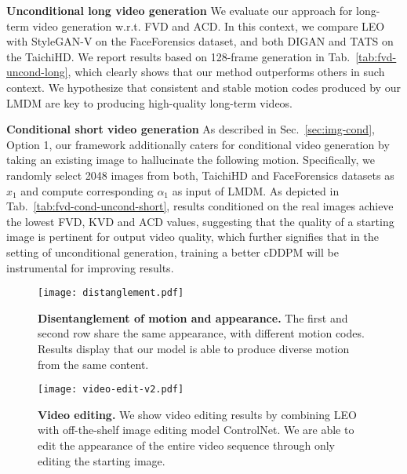 \textbf{Unconditional long video generation} 
We evaluate our approach for long-term video generation w.r.t. FVD and ACD. In this context, we compare LEO with StyleGAN-V on the FaceForensics dataset, and both DIGAN and TATS on the TaichiHD. We report results based on 128-frame generation in Tab.~\ref{tab:fvd-uncond-long}, which clearly shows that our method outperforms others in such context. We hypothesize that consistent and stable motion codes produced by our LMDM are key to producing high-quality long-term videos.

\textbf{Conditional short video generation}
As described in Sec.~\ref{sec:img-cond}, Option 1, our framework additionally caters for conditional video generation by taking an existing image to hallucinate the following motion. Specifically, we randomly select 2048 images from both, TaichiHD and FaceForensics datasets as $x_1$ and compute corresponding $\alpha_1$ as input of LMDM. As depicted in Tab.~\ref{tab:fvd-cond-uncond-short}, results conditioned on the real images achieve the lowest FVD, KVD and ACD values, suggesting that the quality of a starting image is pertinent for output video quality, which further signifies that in the setting of unconditional generation, training a better cDDPM will be instrumental for improving results.

\begin{figure*}[t!]
\centering
\texttt{[image: distanglement.pdf]}  
\caption{\textbf{Disentanglement of motion and appearance.} The first and second row share the same appearance, with different motion codes. Results display that our model is able to produce diverse motion from the same content.}%
\label{fig:disentanglement}
\end{figure*}

\begin{figure*}[t!]
\centering
\texttt{[image: video-edit-v2.pdf]}  
\caption{\textbf{Video editing.} We show video editing results by combining LEO with off-the-shelf image editing model ControlNet. We are able to edit the appearance of the entire video sequence through only editing the starting image.}
\label{fig:semantic-edit-taichi}
\end{figure*}

